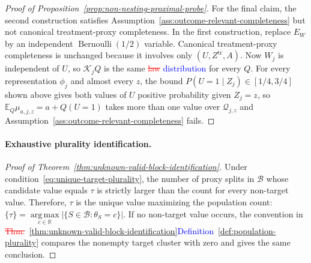 \begin{proof}[Proof of Proposition~\ref{prop:non-nesting-proximal-probe}]
For the final claim, the second construction satisfies Assumption~\ref{ass:outcome-relevant-completeness} but not canonical treatment-proxy completeness. In the first construction, replace $E_W$ by an independent $\operatorname{Bernoulli}(1/2)$ variable. Canonical treatment-proxy completeness is unchanged because it involves only $(U,Z^{\mathrm{tr}},A)$. Now $W_j$ is independent of $U$, so $\mathcal K_jQ$ is the same \textcolor{red}{\sout{law}} \textcolor{blue}{distribution} for every $Q$. For every representation $\phi_j$ and almost every $z$, the bound $P(U=1\mid Z_j)\in[1/4,3/4]$ shown above gives both values of $U$ positive probability given $Z_j=z$, so $\mathbb E_Q\mu_{a,j,z}=a+Q(U=1)$ takes more than one value over $\mathcal Q_{j,z}$ and Assumption~\ref{ass:outcome-relevant-completeness} fails.
\end{proof}

\paragraph{Exhaustive plurality identification.}
\begin{proof}[Proof of Theorem~\ref{thm:unknown-valid-block-identification}]
Under condition~\eqref{eq:unique-target-plurality}, the number of proxy splits in $\mathcal B$ whose candidate value equals $\tau$ is strictly larger than the count for every non-target value. Therefore, $\tau$ is the unique value maximizing the population count:
\(\{\tau\} = \underset{c\in\mathbb R}{\operatorname{arg\,max}} \bigl|\{S\in\mathcal B:\theta_S=c\}\bigr|.\)
If no non-target value occurs, the convention in \textcolor{red}{\sout{Thm.}~\ref{thm:unknown-valid-block-identification}}\textcolor{blue}{Definition~\ref{def:population-plurality}} compares the nonempty target cluster with zero and gives the same conclusion.
\end{proof}

